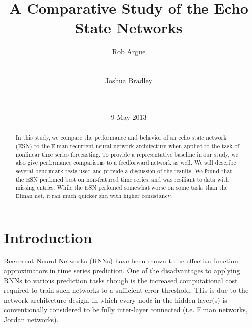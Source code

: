 \documentclass{acm_proc_article-sp}
\begin{document}
\title{A Comparative Study of the Echo State Networks}

\author{
\alignauthor
Rob Argue\\
       \\
       \\
\alignauthor
Joshua Bradley\\
       \\
       \\
}

\date{9 May 2013}

\maketitle
\begin{abstract}
In this study, we compare the performance and behavior of an echo state network (ESN) to the Elman recurrent neural network architecture when applied to the task of nonlinear time series forecasting. To provide a representative baseline in our study, we also give performance comparisons to a feedforward network as well. We will describe several benchmark tests used and provide a discussion of the results. We found that the ESN perfomed best on non-featured time series, and was resiliant to data with missing entries. While the ESN perfomed somewhat worse on some tasks than the Elman net, it ran much quicker and with higher consistancy.
\end{abstract}

\section{Introduction}
Recurrent Neural Networks (RNNs) have been shown to be effective function approximators in time series prediction. One of the disadvantages to applying RNNs to various prediction tasks though is the increased computational cost required to train such networks to a sufficient error threshold. This is due to the network architecture design, in which every node in the hidden layer(s) is conventionally considered to be fully inter-layer connected (i.e. Elman networks, Jordan networks).
\end{document}
